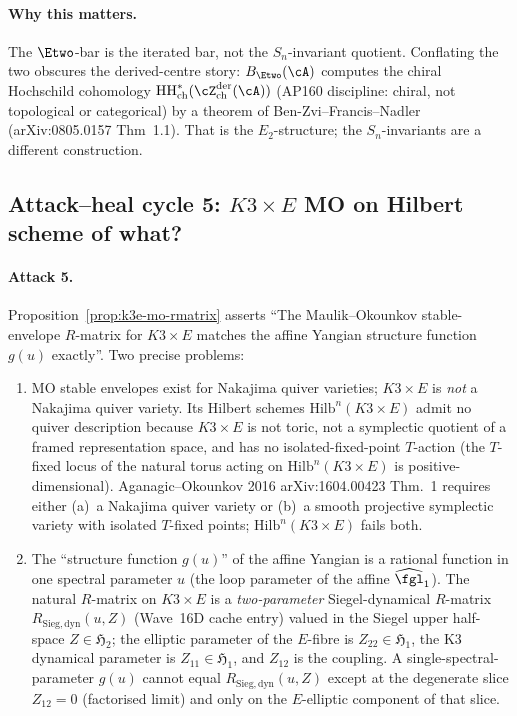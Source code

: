 \paragraph{Why this matters.}  The $\Etwo$-bar is the iterated bar,
not the $S_n$-invariant quotient.  Conflating the two obscures the
derived-centre story: $B_{\Etwo}(\cA)$ computes the chiral Hochschild cohomology
$\operatorname{HH}^*_{\mathrm{ch}}(\cZ^{\mathrm{der}}_{\mathrm{ch}}(\cA))$
(AP160 discipline: chiral, not topological or categorical) by a
theorem of Ben-Zvi--Francis--Nadler (arXiv:0805.0157 Thm~1.1).  That is the
$E_2$-structure; the $S_n$-invariants are a different construction.

\subsection*{Attack--heal cycle 5: $K3\times E$ MO on Hilbert scheme
of what?}

\paragraph{Attack 5.}  Proposition~\ref{prop:k3e-mo-rmatrix} asserts
``The Maulik--Okounkov stable-envelope $R$-matrix for $K3\times E$
matches the affine Yangian structure function $g(u)$ exactly''.
Two precise problems:
\begin{enumerate}[label=\textup{(\roman*)}]
\item MO stable envelopes exist for Nakajima quiver varieties;
$K3\times E$ is \emph{not} a Nakajima quiver variety.  Its Hilbert
schemes $\mathrm{Hilb}^n(K3\times E)$ admit no quiver description
because $K3\times E$ is not toric, not a symplectic quotient of a
framed representation space, and has no isolated-fixed-point
$T$-action (the $T$-fixed locus of the natural torus acting on
$\mathrm{Hilb}^n(K3\times E)$ is positive-dimensional).  Aganagic--Okounkov
2016 arXiv:1604.00423 Thm.~1 requires either (a)~a Nakajima
quiver variety or (b)~a smooth projective symplectic variety with
isolated $T$-fixed points; $\mathrm{Hilb}^n(K3\times E)$ fails both.
\item The ``structure function $g(u)$'' of the affine Yangian is
a rational function in one spectral parameter $u$ (the loop
parameter of the affine $\widehat{\fgl}_1$).  The natural $R$-matrix
on $K3\times E$ is a \emph{two-parameter} Siegel-dynamical $R$-matrix
$R_{\mathrm{Sieg,dyn}}(u, Z)$ (Wave~16D cache entry) valued in the
Siegel upper half-space $Z\in\mathfrak H_2$; the elliptic parameter
of the $E$-fibre is $Z_{22}\in\mathfrak H_1$, the K3 dynamical
parameter is $Z_{11}\in\mathfrak H_1$, and $Z_{12}$ is the coupling.
A single-spectral-parameter $g(u)$ cannot equal
$R_{\mathrm{Sieg,dyn}}(u, Z)$ except at the degenerate slice
$Z_{12} = 0$ (factorised limit) and only on the
$E$-elliptic component of that slice.
\end{enumerate}

